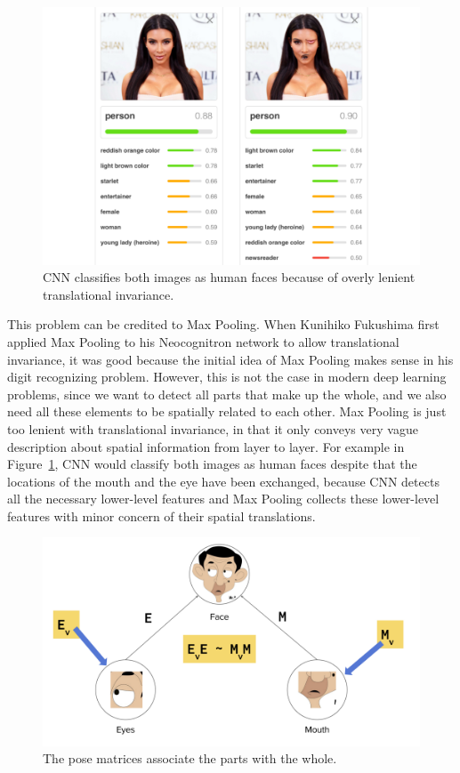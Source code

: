 \documentclass{article}
\begin{document}
\begin{figure}[!htb]
	\centering\includegraphics[width=\textwidth]{fig/maxpooling}
	\caption{CNN classifies both images as human faces because of overly lenient translational invariance.\protect\footnotemark }\label{fig:maxpooling}
\end{figure}


This problem can be credited to Max Pooling. When Kunihiko Fukushima first applied Max Pooling to his Neocognitron network\cite{fukushima1983neocognitron} to allow translational invariance, it was good because the initial idea of Max Pooling makes sense in his digit recognizing problem. However, this is not the case in modern deep learning problems, since we want to detect all parts that make up the whole, and we also need all these elements to be spatially related to each other. Max Pooling is just too lenient with translational invariance, in that it only conveys very vague description about spatial information from layer to layer. For example in Figure~\ref{fig:maxpooling}, CNN would classify both images as human faces despite that the locations of the mouth and the eye have been exchanged, because CNN detects all the necessary lower-level features and Max Pooling collects these lower-level features with minor concern of their spatial translations. 

\begin{figure}[!htb]
	\centering\includegraphics[width=.8\textwidth]{fig/partwhole}
	\caption{The pose matrices associate the parts with the whole.\protect\footnotemark }\label{fig:partwhole}
\end{figure}
\end{document}

